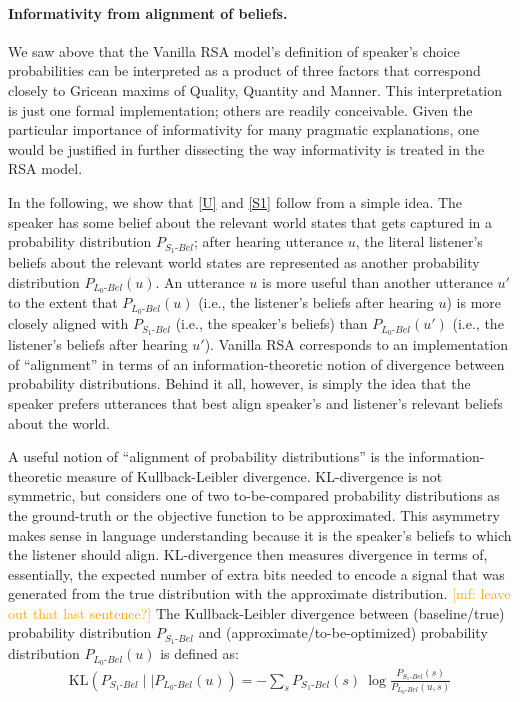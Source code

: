 \documentclass{sp}
\newcommand{\mf}[1]{\textcolor{orange}{[mf: #1]}}
\begin{document}
\paragraph{Informativity from alignment of beliefs.} We saw above that the Vanilla RSA
model's definition of speaker's choice probabilities can be interpreted as a product of three
factors that correspond closely to Gricean maxims of Quality, Quantity and Manner.
This interpretation is just one formal implementation; others are readily conceivable. Given the particular
importance of informativity for many pragmatic explanations, one would be justified in further dissecting
the way informativity is treated in the RSA model.

In the following, we show that \eqref{U} and \eqref{S1} follow from a simple idea.
The speaker has some belief about the relevant world states that gets captured in a probability distribution $P_{S_{1}\text{-}Bel}$;
after hearing utterance $u$, the literal listener's beliefs about the relevant world states are
represented as another probability distribution $P_{L_{0}\text{-}Bel}(u)$. An utterance $u$ is more useful
than another utterance $u'$ to the extent that $P_{L_{0}\text{-}Bel}(u)$  (i.e., the listener's beliefs after hearing $u$) is
more closely aligned with $P_{S_{1}\text{-}Bel}$ (i.e., the speaker's beliefs) than
$P_{L_{0}\text{-}Bel}(u')$  (i.e., the listener's beliefs after hearing $u'$).
Vanilla RSA corresponds to an implementation of ``alignment'' in terms of an information-theoretic notion of divergence between probability distributions.
Behind it all, however, is simply the idea that the speaker prefers
utterances that best align speaker's and listener's relevant beliefs about the world.

A useful notion of ``alignment of probability distributions'' is the information-theoretic
measure of Kullback-Leibler divergence. KL-divergence is not symmetric, but considers one of
two to-be-compared probability distributions as the ground-truth or the objective function
to be approximated.
This asymmetry makes sense in language understanding because it is the speaker's
beliefs to which the listener should align. KL-divergence then measures divergence in terms of,
essentially, the expected number of extra bits needed to encode a signal that was generated
from the true distribution with the approximate distribution. \mf{leave out that last
  sentence?} The Kullback-Leibler divergence between (baseline/true) probability distribution
$P_{S_{1}\text{-}Bel}$ and (approximate/to-be-optimized) probability distribution
$P_{L_{0}\text{-}Bel}(u)$ is defined as:
\begin{align}
  \label{eq:KL-divergence}
  \text{KL}(P_{S_{1}\text{-}Bel} \mid \mid P_{L_{0}\text{-}Bel}(u)) = - \sum_{s} P_{S_{1}\text{-}Bel}(s) \ \log \frac{P_{S_{1}\text{-}Bel}(s)}{P_{L_{0}\text{-}Bel}(u,s)}
\end{align}
\end{document}
